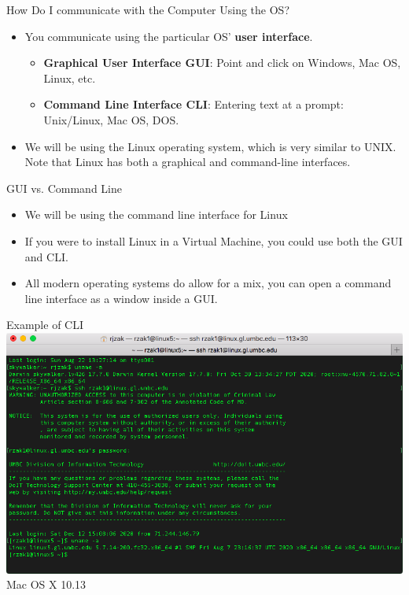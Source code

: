 \documentclass[graphics]{beamer}
\begin{document}
\begin{frame}{How Do I communicate with the Computer Using the OS?}
    \begin{itemize}
        \item You communicate using the particular OS' \textbf{user interface}.
        \begin{itemize}
            \item \textbf{Graphical User Interface GUI}: Point and click on Windows, Mac OS, Linux, etc.
            \item \textbf{Command Line Interface CLI}: Entering text at a prompt: Unix/Linux, Mac OS, DOS.
        \end{itemize}
        \item We will be using the Linux operating system, which is very similar to UNIX. Note that Linux has both a graphical and command-line interfaces.
    \end{itemize}
\end{frame}

\begin{frame}{GUI vs. Command Line}
    \begin{itemize}
        \item We will be using the command line interface for Linux
        \item If you were to install Linux in a Virtual Machine, you could use both the GUI and CLI.
        \item All modern operating systems do allow for a mix, you can open a command line interface as a window inside a GUI.
    \end{itemize}
\end{frame}

\begin{frame}{Example of CLI}
    \includegraphics[scale=0.43]{L03_OperatingSystems/L3_SSH.png}
    \footnotesize{Mac OS X 10.13}
\end{frame}
\end{document}

